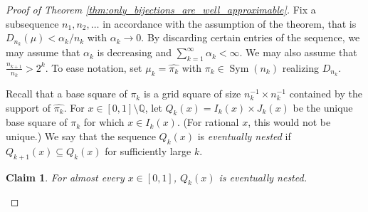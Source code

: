 \documentclass[10pt,a4paper]{amsart}
\newtheorem{claim}{Claim}
\newcommand{\Sym}{\mathop{\mathrm{Sym}}}
\begin{document}
\begin{proof}[Proof of Theorem \ref{thm:only_bijections_are_well_approximable}]
    Fix a subsequence $n_1, n_2, \dots$ in accordance with the assumption of the theorem, that is $D_{n_k}(\mu)<\alpha_{k}/n_k$ with $\alpha_{k}\to 0$.
    By discarding certain entries of the sequence, we may assume that $\alpha_{k}$ is decreasing and $\sum_{k=1}^{\infty} \alpha_{k} < \infty$. We may also assume that $\frac{n_{k+1}}{n_k}>2^k$. To ease notation, set $\mu_{k} = \widehat{\pi_{k}}$ with $\pi_{k}\in \Sym(n_k)$ realizing $D_{n_k}$.

     Recall that a base square of $\pi_{k}$ is a grid square of size $n_k^{-1}\times n_k^{-1}$ contained by the support of $\widehat{\pi_k}$. For $x\in [0, 1]\setminus \mathbb{Q}$, let $Q_k(x)=I_k(x)\times J_k(x)$ be the unique base square of $\pi_{k}$ for which $x\in I_k(x)$. (For rational $x$, this would not be unique.) We say that the sequence $Q_k(x)$ is \emph{eventually nested} if $Q_{k+1}(x)\subseteq Q_k(x)$ for sufficiently large $k$.

    \begin{claim}\label{claim:stab}
        For almost every $x\in [0, 1]$, $Q_k(x)$ is eventually nested.
    \end{claim}


\end{proof}
\end{document}
